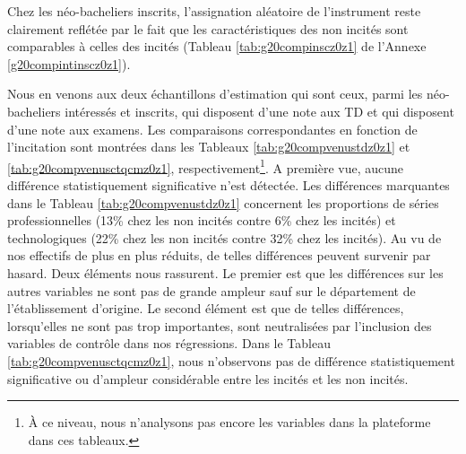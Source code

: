 \documentclass[
]{book}
\begin{document}
Chez les néo-bacheliers inscrits, l'assignation aléatoire de l'instrument reste clairement reflétée par le fait que les caractéristiques des non incités sont comparables à celles des incités (Tableau \ref{tab:g20compinscz0z1} de l'Annexe \ref{g20compintinscz0z1}).

Nous en venons aux deux échantillons d'estimation qui sont ceux, parmi les néo-bacheliers intéressés et inscrits, qui disposent d'une note aux TD et qui disposent d'une note aux examens. Les comparaisons correspondantes en fonction de l'incitation sont montrées dans les Tableaux \ref{tab:g20compvenustdz0z1} et \ref{tab:g20compvenusctqcmz0z1}, respectivement\footnote{À ce niveau, nous n'analysons pas encore les variables dans la plateforme dans ces tableaux.}. A première vue, aucune différence statistiquement significative n'est détectée. Les différences marquantes dans le Tableau \ref{tab:g20compvenustdz0z1} concernent les proportions de séries professionnelles (13\% chez les non incités contre 6\% chez les incités) et technologiques (22\% chez les non incités contre 32\% chez les incités). Au vu de nos effectifs de plus en plus réduits, de telles différences peuvent survenir par hasard. Deux éléments nous rassurent. Le premier est que les différences sur les autres variables ne sont pas de grande ampleur sauf sur le département de l'établissement d'origine. Le second élément est que de telles différences, lorsqu'elles ne sont pas trop importantes, sont neutralisées par l'inclusion des variables de contrôle dans nos régressions. Dans le Tableau \ref{tab:g20compvenusctqcmz0z1}, nous n'observons pas de différence statistiquement significative ou d'ampleur considérable entre les incités et les non incités.

\newpage
\begingroup\fontsize{5}{7}\selectfont
\end{document}
